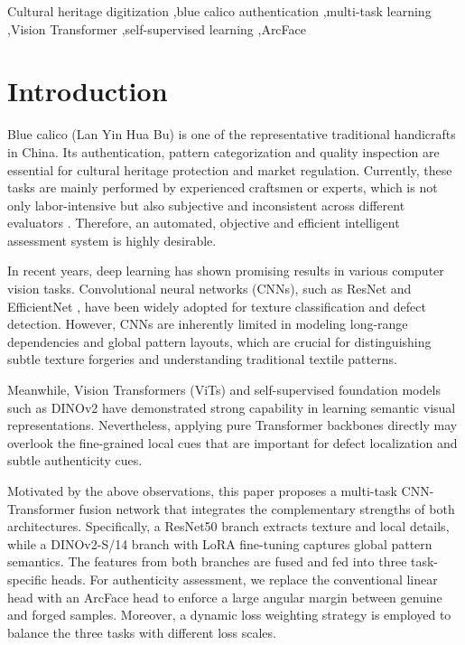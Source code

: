 \documentclass[preprint,12pt,a4paper]{elsarticle}
\begin{document}
\begin{frontmatter}
\begin{keywords}
Cultural heritage digitization \sep blue calico authentication \sep multi-task learning \sep Vision Transformer \sep self-supervised learning \sep ArcFace
\end{keywords}

\end{frontmatter}

\section{Introduction}\label{sec:intro}

Blue calico (Lan Yin Hua Bu) is one of the representative traditional handicrafts in China.
Its authentication, pattern categorization and quality inspection are essential for cultural heritage protection and market regulation.
Currently, these tasks are mainly performed by experienced craftsmen or experts, which is not only labor-intensive but also subjective and inconsistent across different evaluators \citep{sample-ref}.
Therefore, an automated, objective and efficient intelligent assessment system is highly desirable.

In recent years, deep learning has shown promising results in various computer vision tasks.
Convolutional neural networks (CNNs), such as ResNet \citep{he2016deep} and EfficientNet \citep{tan2019efficientnet}, have been widely adopted for texture classification and defect detection.
However, CNNs are inherently limited in modeling long-range dependencies and global pattern layouts, which are crucial for distinguishing subtle texture forgeries and understanding traditional textile patterns.

Meanwhile, Vision Transformers (ViTs) and self-supervised foundation models such as DINOv2 \citep{oquab2023dinov2} have demonstrated strong capability in learning semantic visual representations.
Nevertheless, applying pure Transformer backbones directly may overlook the fine-grained local cues that are important for defect localization and subtle authenticity cues.

Motivated by the above observations, this paper proposes a multi-task CNN-Transformer fusion network that integrates the complementary strengths of both architectures.
Specifically, a ResNet50 branch extracts texture and local details, while a DINOv2-S/14 branch with LoRA fine-tuning captures global pattern semantics.
The features from both branches are fused and fed into three task-specific heads.
For authenticity assessment, we replace the conventional linear head with an ArcFace head \citep{deng2019arcface} to enforce a large angular margin between genuine and forged samples.
Moreover, a dynamic loss weighting strategy is employed to balance the three tasks with different loss scales.
\end{document}
